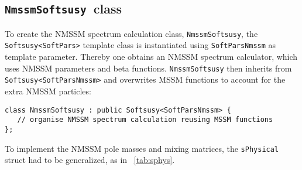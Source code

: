 \documentclass[final,3p,times,pdflatex]{elsarticle}
\def\code#1{\small{\tt #1}\normalsize}
\begin{document}
\subsection{\code{NmssmSoftsusy}~class}
\label{nmssmsoftsusy}

To create the NMSSM spectrum calculation class, \code{NmssmSoftsusy},
the \code{Softsusy<SoftPars>} template class is instantiated using
\code{SoftParsNmssm} as template parameter.  Thereby one obtains an
NMSSM spectrum calculator, which uses NMSSM parameters and beta
functions.  \code{NmssmSoftsusy} then inherits from
\code{Softsusy<SoftParsNmssm>} and overwrites MSSM functions to
account for the extra NMSSM particles:
%
\begin{verbatim}
class NmssmSoftsusy : public Softsusy<SoftParsNmssm> {
   // organise NMSSM spectrum calculation reusing MSSM functions
};
\end{verbatim}
%
To implement the NMSSM pole masses and mixing matrices, the
\code{sPhysical} struct had to be generalized, as in
\tablename~\ref{tab:sphys}.
%
\end{document}
